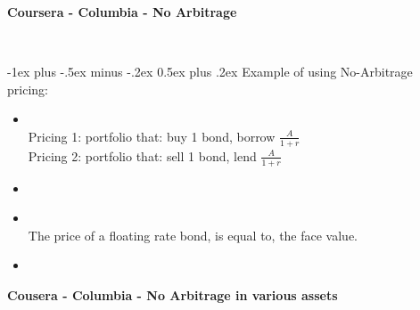 \documentclass[10pt,landscape]{article}
\makeatletter
\renewcommand{\section}{\@startsection{section}{1}{0mm}%
                                {-1ex plus -.5ex minus -.2ex}%
                                {0.5ex plus .2ex}%
                                {\normalfont\large\bfseries}}
\makeatother
\begin{document}





\newpage

\begin{center}
     \Large{\textbf{Coursera - Columbia - No Arbitrage}} \\
\end{center}\\

\begin{multicols}{2}
\setlength{\premulticols}{1pt}
\setlength{\postmulticols}{1pt}
\setlength{\multicolsep}{1pt}
\setlength{\columnsep}{2pt}

\section{Example of using No-Arbitrage pricing: }
\begin{itemize}
	\item {}
		\\Pricing 1: portfolio that: buy 1 bond, borrow $\frac{A}{1+r}$
		\\Pricing 2: portfolio that: sell 1 bond, lend $\frac{A}{1+r}$
	\item {}
	\item {}
		\\The price of a floating rate bond, is equal to, the face value.
	\item 
\end{itemize}


			
\end{multicols}


\begin{center}
     \Large{\textbf{Cousera - Columbia - No Arbitrage in various assets}} \\
\end{center}\\
\end{document}
